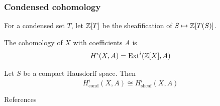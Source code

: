 \documentclass{beamer}
\begin{document}
\begin{frame}
    \frametitle{Condensed cohomology}

    For a condensed set $T$, let $\mathbb{Z}[T]$ be the sheafification
    of $S \mapsto \mathbb{Z}[T(S)]$.
    \begin{definition}
        The cohomology of $X$ with coefficients $A$ is
        \begin{equation*}
            H^i (X, A) = \operatorname{Ext}^i(\mathbb{Z}[\underline{X}], \underline{A})
        \end{equation*}
    \end{definition}

    \pause
    \begin{theorem}
        Let $S$ be a compact Hausdorff space. Then
        \begin{equation*}
            H^i_{\text{cond}}(X, A) \cong H^i_{\text{sheaf}}(X, A)
        \end{equation*}
    \end{theorem}

\end{frame}


\begin{frame}{References}
    \nocite{Sch2019LecturesCM}
    \nocite{Apa2021condensed}
    \nocite{stacks-project}
    \nocite{Sch2020MasterClass}
    
\end{frame}
\end{document}
